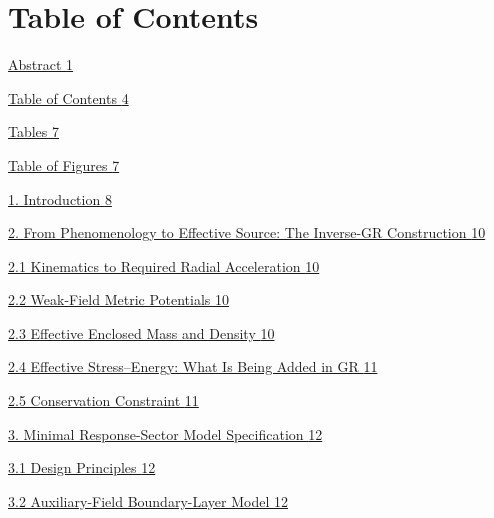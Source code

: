 \section{}\label{section-1}

\section{Table of Contents}\label{table-of-contents}

\hyperref[abstract]{Abstract \hyperref[abstract]{1}}

\hyperref[table-of-contents]{Table of Contents \hyperref[table-of-contents]{4}}

\hyperref[tables]{Tables \hyperref[tables]{7}}

\hyperref[table-of-figures]{Table of Figures \hyperref[table-of-figures]{7}}

\hyperref[introduction]{1. Introduction \hyperref[introduction]{8}}

\hyperref[from-phenomenology-to-effective-source-the-inverse-gr-construction]{2. From Phenomenology to Effective Source: The Inverse-GR Construction \hyperref[from-phenomenology-to-effective-source-the-inverse-gr-construction]{10}}

\hyperref[kinematics-to-required-radial-acceleration]{2.1 Kinematics to Required Radial Acceleration \hyperref[kinematics-to-required-radial-acceleration]{10}}

\hyperref[weak-field-metric-potentials]{2.2 Weak-Field Metric Potentials \hyperref[weak-field-metric-potentials]{10}}

\hyperref[effective-enclosed-mass-and-density]{2.3 Effective Enclosed Mass and Density \hyperref[effective-enclosed-mass-and-density]{10}}

\hyperref[effective-stressenergy-what-is-being-added-in-gr]{2.4 Effective Stress--Energy: What Is Being Added in GR \hyperref[effective-stressenergy-what-is-being-added-in-gr]{11}}

\hyperref[conservation-constraint]{2.5 Conservation Constraint \hyperref[conservation-constraint]{11}}

\hyperref[minimal-response-sector-model-specification]{3. Minimal Response-Sector Model Specification \hyperref[minimal-response-sector-model-specification]{12}}

\hyperref[design-principles]{3.1 Design Principles \hyperref[design-principles]{12}}

\hyperref[auxiliary-field-boundary-layer-model]{3.2 Auxiliary-Field Boundary-Layer Model \hyperref[auxiliary-field-boundary-layer-model]{12}}


